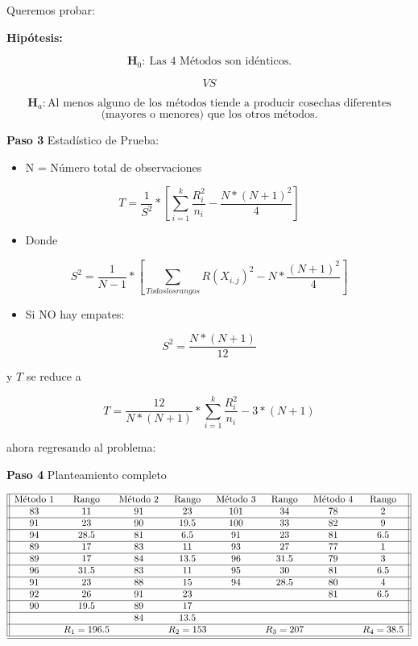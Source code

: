 \documentclass[
  a4paper,
  oneside,
  openany]{book}
\providecommand{\tightlist}{%
  \setlength{\itemsep}{0pt}\setlength{\parskip}{0pt}}
\begin{document}
Queremos probar:

\textbf{Hipótesis:}

\[\textbf{H}_0: \ \mbox{Las 4 Métodos son idénticos.}\]

\[VS\]

\[\textbf{H}_a: \mbox{Al menos alguno de los métodos tiende a producir cosechas diferentes}\]
\[\mbox{(mayores o menores) que los otros métodos.}\]

\textbf{Paso 3} Estadístico de Prueba:

\begin{itemize}
\tightlist
\item
  N = Número total de observaciones
\end{itemize}

\[T= \frac{1}{S^2}*\left[\sum_{i=1}^{k}\frac{R_{i}^2}{n_{i}} - \frac{N*(N+1)^2}{4}\right]\]

\begin{itemize}
\tightlist
\item
  Donde
\end{itemize}

\[ S^2 = \frac{1}{N-1}*\left[\sum_{Todos los rangos}R(X_{i,j})^2 - N*\frac{(N+1)^2}{4}\right] \]

\begin{itemize}
\tightlist
\item
  Si NO hay empates:
\end{itemize}

\[S^2= \frac{N*(N+1)}{12}\]

y \(T\) se reduce a

\[T= \frac{12}{N*(N+1)}*\sum_{i=1}^{k}\frac{R_{i}^2}{n_{i}} - 3*(N+1)\]

ahora regresando al problema:

\textbf{Paso 4} Planteamiento completo

\[
\begin{array}{||c c c c c c c c ||} 
\hline
\mbox{Método 1} & \mbox{Rango} & \mbox{Método 2} & \mbox{Rango}  & \mbox{Método 3} & \mbox{Rango} & \mbox{Método 4} & \mbox{Rango} \\  
\hline
83 & 11 &91 &23 &101 &34 &78 &2 \\ 
\hline
91 & 23 & 90&19.5 &100 &33 &82 &9 \\
\hline
94 &28.5  &81 &6.5 &91 &23 &81 &6.5 \\
\hline
89 & 17 &83 &11 &93 &27 &77 &1 \\
\hline
89 & 17 &84 &13.5 &96 &31.5 &79 &3 \\
\hline
96 & 31.5 &83 &11 &95 &30 &81 &6.5 \\
\hline
91 & 23 &88 &15 &94 &28.5 &80 &4 \\
\hline
92 & 26 &91 &23 & & &81 &6.5 \\
\hline
90 & 19.5 &89 &17 & & && \\
\hline
& &84 &13.5 & & & & \\
\hline
& R_1=196.5 & &R_2=153 & &R_3=207 & &R_4=38.5 \\
\hline
\hline
\end{array}
\]
\end{document}
